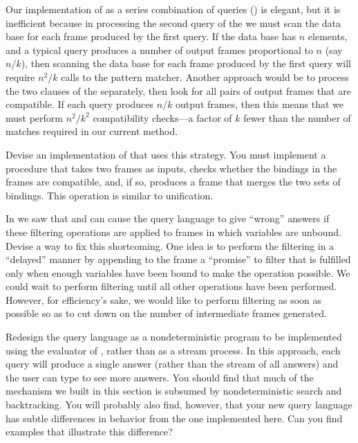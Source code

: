 \begin{exercise}
	\label{Exercise 4.76}
	Our implementation of  as a series combination of queries () is elegant, but it is inefficient because in processing the second query of the  we must scan the data base for each frame produced by the first query.
	If the data base has \( n \) elements, and a typical query produces a number of output frames proportional to \( n \) (say \( n / k \)), then scanning the data base for each frame produced by the first query will require \( n^2 / k \) calls to the pattern matcher.
	Another approach would be to process the two clauses of the  separately, then look for all pairs of output frames that are compatible.
	If each query produces \( n / k \) output frames, then this means that we must perform \( n^2 / k^2 \) compatibility checks---a factor of \( k \) fewer than the number of matches required in our current method.

	Devise an implementation of  that uses this strategy.
	You must implement a procedure that takes two frames as inputs, checks whether the bindings in the frames are compatible, and, if so, produces a frame that merges the two sets of bindings.
	This operation is similar to unification.
\end{exercise}



\begin{exercise}
	\label{Exercise 4.77}
	In  we saw that  and  can cause the query language to give “wrong” answers if these filtering operations are applied to frames in which variables are unbound.
	Devise a way to fix this shortcoming.
	One idea is to perform the filtering in a “delayed” manner by appending to the frame a “promise” to filter that is fulfilled only when enough variables have been bound to make the operation possible.
	We could wait to perform filtering until all other operations have been performed.
	However, for efficiency’s sake, we would like to perform filtering as soon as possible so as to cut down on the number of intermediate frames generated.
\end{exercise}



\begin{exercise}
	\label{Exercise 4.78}
	Redesign the query language as a nondeterministic program to be implemented using the evaluator of , rather than as a stream process.
	In this approach, each query will produce a single answer (rather than the stream of all answers) and the user can type  to see more answers.
	You should find that much of the mechanism we built in this section is subsumed by nondeterministic search and backtracking.
	You will probably also find, however, that your new query language has subtle differences in behavior from the one implemented here.
	Can you find examples that illustrate this difference?
\end{exercise}



